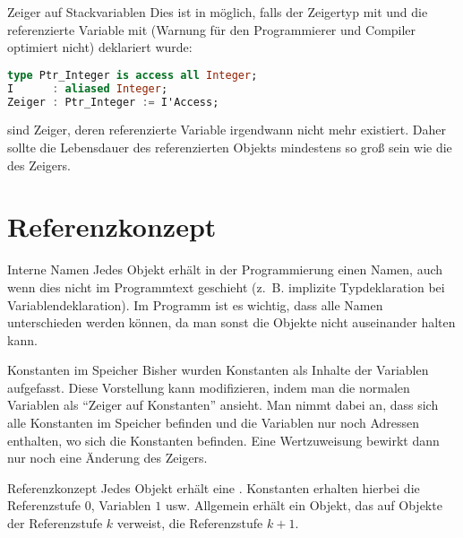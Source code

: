 \begin{Def}{Zeiger auf Stackvariablen}
    Dies ist in \Ada{} möglich, falls der Zeigertyp mit  und die
    referenzierte Variable mit  (Warnung für den Programmierer
    und Compiler optimiert nicht)
    deklariert wurde:

\begin{lstlisting}[language=ada]
type Ptr_Integer is access all Integer;
I      : aliased Integer;
Zeiger : Ptr_Integer := I'Access;
\end{lstlisting}

     sind Zeiger, deren referenzierte Variable
    irgendwann nicht mehr existiert. Daher sollte die Lebensdauer des
    referenzierten Objekts mindestens so groß sein wie die des Zeigers.
\end{Def}

\section{%
    Referenzkonzept%
}

\begin{Def}{Interne Namen}
    Jedes Objekt erhält in der Programmierung einen Namen, auch wenn dies nicht
    im Programmtext geschieht (z.~B. implizite Typdeklaration bei
    Variablendeklaration).
    Im Programm ist es wichtig, dass alle Namen unterschieden werden können,
    da man sonst die Objekte nicht auseinander halten kann.
\end{Def}

\begin{Def}{Konstanten im Speicher}
    Bisher wurden Konstanten als Inhalte der Variablen aufgefasst.
    Diese Vorstellung kann modifizieren, indem man die normalen Variablen als
    "`Zeiger auf Konstanten"' ansieht.
    Man nimmt dabei an, dass sich alle Konstanten im Speicher befinden und die
    Variablen nur noch Adressen enthalten, wo sich die Konstanten befinden.
    Eine Wertzuweisung bewirkt dann nur noch eine Änderung des Zeigers.
\end{Def}

\begin{Def}{Referenzkonzept}
    Jedes Objekt erhält eine .
    Konstanten erhalten hierbei die Referenzstufe $0$, Variablen $1$ usw.
    Allgemein erhält ein Objekt, das auf Objekte der Referenzstufe $k$
    verweist, die Referenzstufe $k + 1$.
\end{Def}

\pagebreak

